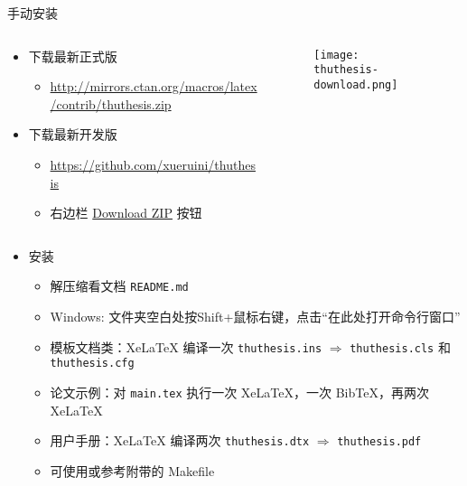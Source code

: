 \begin{frame}{手动安装\ThuThesis}
      \begin{columns}
        \begin{column}{.7\textwidth}
  \begin{itemize}
    \item 下载最新正式版
      \begin{itemize}
        \item \url{http://mirrors.ctan.org/macros/latex/contrib/thuthesis.zip}
      \end{itemize}
    \item 下载最新开发版
      \begin{itemize}
        \item \url{https://github.com/xueruini/thuthesis}
        \item 右边栏
          \href{https://github.com/xueruini/thuthesis/archive/master.zip}%
          {Download ZIP} 按钮
      \end{itemize}
  \end{itemize}
        \end{column}
        \begin{column}{.3\textwidth}
          \begin{figure}[htbp]
            \centering
            \texttt{[image: thuthesis-download.png]}
          \end{figure}
        \end{column}
      \end{columns}
  \begin{itemize}
    \item 安装
      \begin{itemize}
        \item 解压缩看文档 \texttt{README.md}
        \item Windows: 文件夹空白处按Shift+鼠标右键，点击``在此处打开命令行窗口''
        \item 模板文档类：XeLaTeX 编译一次 \texttt{thuthesis.ins} $\Rightarrow$
          \texttt{thuthesis.cls} 和 \texttt{thuthesis.cfg}
        \item 论文示例：对 \texttt{main.tex} 执行一次 XeLaTeX，一次 BibTeX，再两次
          XeLaTeX
        \item 用户手册：XeLaTeX 编译两次 \texttt{thuthesis.dtx} $\Rightarrow$
          \texttt{thuthesis.pdf}
        \item 可使用或参考附带的 Makefile
      \end{itemize}
  \end{itemize}
\end{frame}

